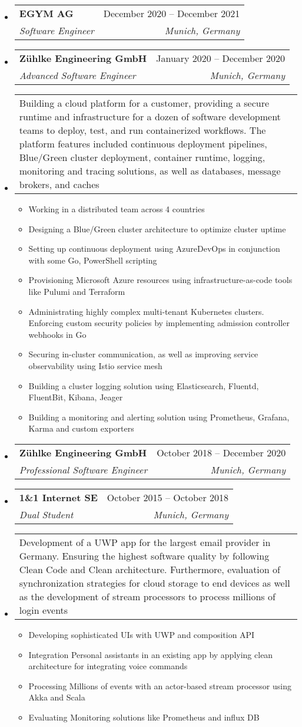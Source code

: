 \documentclass[letterpaper,12pt]{article}
\makeatletter
\def \entryspacing {-0pt}
\newcommand{\resumeEntryStart}{\begin{itemize}[leftmargin=2.5mm]}
\newcommand{\resumeEntryEnd}{\end{itemize}\vspace{\entryspacing}}
\newcommand{\resumeItemListStart}{\begin{itemize}[leftmargin=4.5mm]}
\newcommand{\resumeItemListEnd}{\end{itemize}}
\newcommand{\resumeItem}[1]{
  \item\small{
    {#1 \vspace{-2pt}}
  }
}
\newcommand{\resumeEntryTSDL}[4]{
  \vspace{-1pt}\item[]
    \begin{tabularx}{0.97\textwidth}{X@{\hspace{60pt}}r}
      \textbf{\color{primary}#1} & {\color{accent}\small#2} \\
      \textit{\color{accent}\small#3} & \textit{\color{accent}\small#4} \\
    \end{tabularx}\vspace{-6pt}
}
\newcommand{\resumeEntryDesc}[1]{
  \vspace{-1pt}\item[] 
  \small{
    \begin{tabularx}{0.97\textwidth}{X}
      #1
    \end{tabularx}
  }
  \vspace{-6pt}
}
\makeatother
\begin{document}
  \resumeEntryStart
    \resumeEntryTSDL
      {EGYM AG}{December 2020 -- December 2021}
      {Software Engineer}{Munich, Germany}
  \resumeEntryEnd

  \resumeEntryStart
    \resumeEntryTSDL
      {Zühlke Engineering GmbH}{January 2020 -- December 2020}
      {Advanced Software Engineer}{Munich, Germany}
    \resumeEntryDesc{Building a cloud platform for a customer, providing a secure runtime and infrastructure for a dozen of software development teams to deploy, test, and run containerized workflows. The platform features included continuous deployment pipelines, Blue/Green cluster deployment, container runtime, logging, monitoring and tracing solutions, as well as databases, message brokers, and caches}
    \resumeItemListStart
        \resumeItem {Working in a distributed team across 4 countries}
        \resumeItem {Designing a Blue/Green cluster architecture to optimize cluster uptime}
        \resumeItem {Setting up continuous deployment using AzureDevOps in conjunction with some Go, PowerShell scripting}
        \resumeItem {Provisioning Microsoft Azure resources using infrastructure-as-code tools like Pulumi and Terraform}
        \resumeItem {Administrating highly complex multi-tenant Kubernetes clusters. Enforcing custom security policies by implementing admission controller webhooks in Go}
        \resumeItem {Securing in-cluster communication, as well as improving service observability using Istio service mesh}
        \resumeItem {Building a cluster logging solution using Elasticsearch, Fluentd, FluentBit, Kibana, Jeager}
        \resumeItem {Building a monitoring and alerting solution using Prometheus, Grafana, Karma and custom exporters}
    \resumeItemListEnd
  \resumeEntryEnd

  \resumeEntryStart
    \resumeEntryTSDL
      {Zühlke Engineering GmbH}{October 2018 -- December 2020}
      {Professional Software Engineer}{Munich, Germany}
  \resumeEntryEnd

  \resumeEntryStart
    \resumeEntryTSDL
    {1\&1 Internet SE}{October 2015 -- October 2018}
    {Dual Student}{Munich, Germany}
    \resumeEntryDesc{Development of a UWP app for the largest email provider in Germany. Ensuring the highest software quality by following Clean Code and Clean architecture. Furthermore, evaluation of synchronization strategies for cloud storage to end devices as well as the development of stream processors to process millions of login events}
    \resumeItemListStart
      \resumeItem {Developing sophisticated UIs with UWP and composition API}
      \resumeItem {Integration Personal assistants in an existing app by applying clean architecture for integrating voice commands}
      \resumeItem {Processing Millions of events with an actor-based stream processor using Akka and Scala}
      \resumeItem {Evaluating Monitoring solutions like Prometheus and influx DB}
    \resumeItemListEnd
  \resumeEntryEnd
\end{document}
